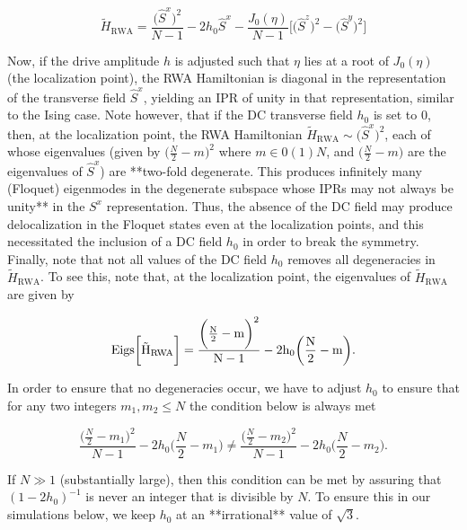 \documentclass{article}
\begin{document}
\begin{equation*}
\tilde{H}_{\mathrm{RWA}}= \frac{\big(\hat{S}^x\big)^{2}}{N-1} - 2h_0 \hat{S}^x - \frac{J_0(\eta)}{N-1}\bigg[\big(\hat{S}^z\big)^{2} - \big(\hat{S}^y\big)^{2} \bigg]
\end{equation*}


Now, if the drive amplitude $h$ is adjusted such that $\eta$ lies at a root of $J_0(\eta)$ (the localization point), the RWA Hamiltonian is diagonal in the representation of the transverse field $\hat{S}^x$, yielding an IPR of unity in that representation, similar to the Ising case. Note however, that if the DC transverse field $h_0$ is set to $0$, then, at the localization point, the RWA Hamiltonian $\tilde{H}_{\mathrm{RWA}}\sim
\big(\hat{S}^x\big)^2$, each of whose eigenvalues (given by $\big(\frac{N}{2}-m\big)^2$ where $m \in 0(1)N$, and $\big(\frac{N}{2}-m\big)$  are the eigenvalues of $\hat{S}^x$) are **two-fold degenerate. This produces infinitely many (Floquet) eigenmodes in the degenerate subspace whose IPRs may not always be unity** in the $S^x$ representation. Thus, the absence of the DC field may produce delocalization in the Floquet states even at the localization points, and this necessitated the inclusion of a DC field $h_0$ in order to break the symmetry.
Finally, note that not all values of the DC field $h_0$ removes all degeneracies in $\tilde{H}_{\mathrm{RWA}}$. To see this, note that, at the localization point, the eigenvalues of $\tilde{H}_{\mathrm{RWA}}$ are given by

\begin{equation*}
\rm{Eigs}\bigg[\tilde{H}_{\mathrm{RWA}}\bigg] = \frac{\bigg(\frac{N}{2}-m\bigg)^2}{N-1} - 2h_0 \bigg(\frac{N}{2}-m\bigg).
\end{equation*}

In order to ensure that no degeneracies occur, we have to adjust $h_0$ to ensure that for any two integers $m_1, m_2 \leq N$  the condition below is always met


\begin{equation*}
\frac{\bigg(\frac{N}{2}-m_1\bigg)^2}{N-1} - 2h_0 \bigg(\frac{N}{2}-m_1\bigg) \neq \frac{\bigg(\frac{N}{2}-m_2\bigg)^2}{N-1} - 2h_0 \bigg(\frac{N}{2}-m_2\bigg).
\end{equation*}

If $N\gg 1$ (substantially large), then this condition can be met by assuring that $(1-2h_0)^{-1}$ is never an integer that is divisible by $N$. To ensure this in our simulations below, we keep $h_0$ at an **irrational** value of $\sqrt{3}$.
\end{document}
